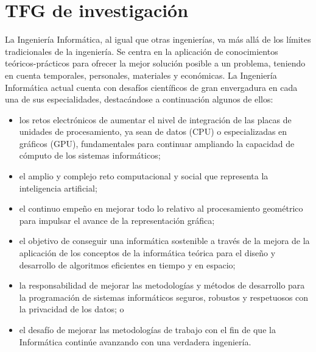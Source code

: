 \section{TFG de investigación}



La Ingeniería Informática, al igual que otras ingenierías, va más allá de los límites tradicionales de la ingeniería. Se centra en la aplicación de conocimientos teóricos-prácticos para ofrecer la mejor solución posible a un problema, teniendo en cuenta temporales, personales, materiales y económicas. La Ingeniería Informática actual cuenta con desafíos científicos de gran envergadura en cada una de sus especialidades, destacándose a continuación algunos de ellos:
\begin{itemize}
    \item los retos electrónicos de aumentar el nivel de integración de las placas de unidades de procesamiento, ya sean de datos (CPU) o especializadas en gráficos (GPU), fundamentales para continuar ampliando la capacidad de cómputo de los sistemas informáticos;
    \item el amplio y complejo reto computacional y social que representa la inteligencia artificial;
    \item el continuo empeño en mejorar todo lo relativo al procesamiento geométrico para impulsar el avance de la representación gráfica;
    \item el objetivo de conseguir una informática sostenible a través de la mejora de la aplicación de los conceptos de la informática teórica para el diseño y desarrollo de algoritmos eficientes en tiempo y en espacio;
    \item la responsabilidad de mejorar las metodologías y métodos de desarrollo para la programación de sistemas informáticos seguros, robustos y respetuosos con la privacidad de los datos; o
    \item el desafío de mejorar las metodologías de trabajo con el fin de que la Informática continúe avanzando con una verdadera ingeniería.
\end{itemize}
